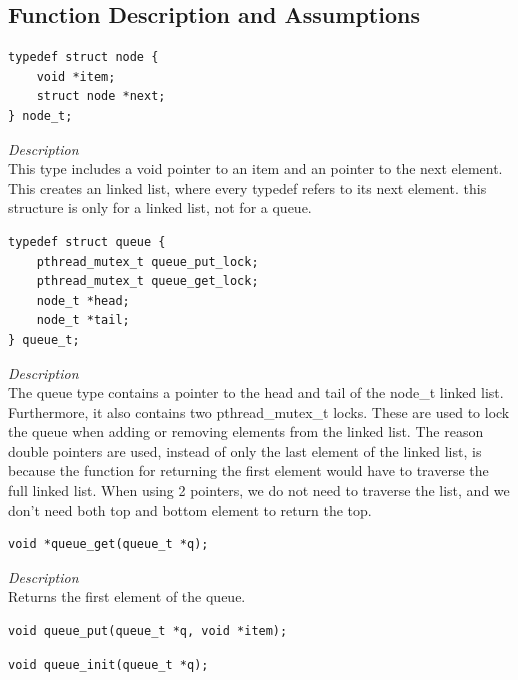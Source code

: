 \documentclass[11pt]{article}
\begin{document}
\subsection*{Function Description and Assumptions}


\begin{lstlisting}[style=customc]
typedef struct node {
    void *item;
    struct node *next;
} node_t;
\end{lstlisting}
\textit{Description} \\
This type includes a void pointer to an item and an pointer to the next element.
 This creates an linked list, where every typedef refers to its next element.
 this structure is only for a linked list, not for a queue.



\begin{lstlisting}[style=customc]
typedef struct queue {
    pthread_mutex_t queue_put_lock;
    pthread_mutex_t queue_get_lock;
    node_t *head;
    node_t *tail;
} queue_t;
\end{lstlisting}
\textit{Description} \\
The queue type contains a pointer to the head and tail of the node\_t linked list. Furthermore, it also
contains two pthread\_mutex\_t locks. These are used to lock the queue when adding or removing elements
from the linked list. The reason double pointers are used, instead of only the last element of the linked list, is because the function for returning the first element would have to traverse the full linked list.
When using 2 pointers, we do not need to traverse the list, and we don't need both top and bottom element to return the top.




\begin{lstlisting}[style=customc]
void *queue_get(queue_t *q);
\end{lstlisting}
\textit{Description} \\
Returns the first element of the queue.



\begin{lstlisting}[style=customc]
void queue_put(queue_t *q, void *item);
\end{lstlisting}



\begin{lstlisting}[style=customc]
void queue_init(queue_t *q);
\end{lstlisting}
\end{document}
